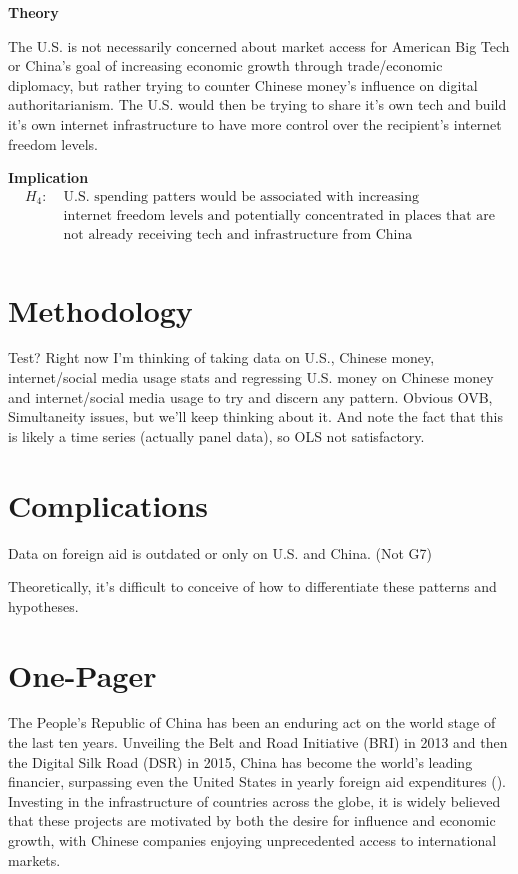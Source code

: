 \documentclass{article}
\begin{document}
\textbf{Theory}

The U.S. is not necessarily concerned about market access for American Big Tech or China's goal of increasing economic growth through trade/economic diplomacy, but rather trying to counter Chinese money's influence on digital authoritarianism. The U.S. would then be trying to share it's own tech and build it's own internet infrastructure to have more control over the recipient's internet freedom levels.

\textbf{Implication}
\begin{align*}
    H_4:\; & \text{U.S. spending patters would be associated with increasing}\\
    & \text{internet freedom levels and potentially concentrated in places that are}\\
    & \text{not already receiving tech and infrastructure from China}\\
\end{align*}

\section*{Methodology}
Test? Right now I'm thinking of taking data on U.S., Chinese money, internet/social media usage stats and regressing U.S. money on Chinese money and internet/social media usage to try and discern any pattern. Obvious OVB, Simultaneity issues, but we'll keep thinking about it. And note the fact that this is likely a time series (actually panel data), so OLS not satisfactory.

\section*{Complications}
Data on foreign aid is outdated or only on U.S. and China. (Not G7)

Theoretically, it's difficult to conceive of how to differentiate these patterns and hypotheses. 

\section*{One-Pager}
The People's Republic of China has been an enduring act on the world stage of the last ten years. Unveiling the Belt and Road Initiative (BRI) in 2013 and then the Digital Silk Road (DSR) in 2015, China has become the world's leading financier, surpassing even the United States in yearly foreign aid expenditures (\cite{dreherND}).
Investing in the infrastructure of countries across the globe, it is widely believed that these projects are motivated by both the desire for influence and economic growth, with Chinese companies enjoying unprecedented access to international markets.
\end{document}
